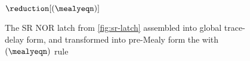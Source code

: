 \begin{figure}
    \centering
    \(\reduction[(\mealyeqn)]\)
    \caption{
        The SR NOR latch from \cref{fig:sr-latch} assembled into global
        trace-delay form, and transformed into pre-Mealy form the with
        \((\mealyeqn)\) rule
    }
    \label{fig:sr-latch-global-trace-delay}
\end{figure}